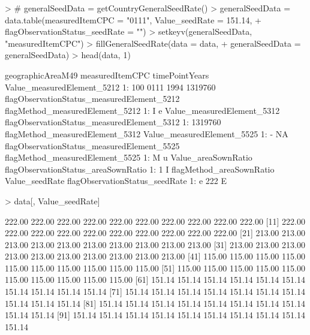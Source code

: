 \documentclass[nojss]{jss}
\begin{document}
\begin{Schunk}
\begin{Sinput}
> # generalSeedData = getCountryGeneralSeedRate()
> generalSeedData = data.table(measuredItemCPC = "0111", Value_seedRate = 151.14,
+                              flagObservationStatus_seedRate = "")
> setkeyv(generalSeedData, "measuredItemCPC")
> fillGeneralSeedRate(data = data,
+                     generalSeedData = generalSeedData)
> head(data, 1)
\end{Sinput}
\begin{Soutput}
   geographicAreaM49 measuredItemCPC timePointYears Value_measuredElement_5212
1:               100            0111           1994                    1319760
   flagObservationStatus_measuredElement_5212 flagMethod_measuredElement_5212
1:                                          I                               e
   Value_measuredElement_5312 flagObservationStatus_measuredElement_5312
1:                    1319760                                           
   flagMethod_measuredElement_5312 Value_measuredElement_5525
1:                               -                         NA
   flagObservationStatus_measuredElement_5525 flagMethod_measuredElement_5525
1:                                          M                               u
   Value_areaSownRatio flagObservationStatus_areaSownRatio
1:                   1                                   I
   flagMethod_areaSownRatio Value_seedRate flagObservationStatus_seedRate
1:                        e            222                              E
\end{Soutput}
\begin{Sinput}
> data[, Value_seedRate]
\end{Sinput}
\begin{Soutput}
  [1] 222.00 222.00 222.00 222.00 222.00 222.00 222.00 222.00 222.00 222.00
 [11] 222.00 222.00 222.00 222.00 222.00 222.00 222.00 222.00 222.00 222.00
 [21] 213.00 213.00 213.00 213.00 213.00 213.00 213.00 213.00 213.00 213.00
 [31] 213.00 213.00 213.00 213.00 213.00 213.00 213.00 213.00 213.00 213.00
 [41] 115.00 115.00 115.00 115.00 115.00 115.00 115.00 115.00 115.00 115.00
 [51] 115.00 115.00 115.00 115.00 115.00 115.00 115.00 115.00 115.00 115.00
 [61] 151.14 151.14 151.14 151.14 151.14 151.14 151.14 151.14 151.14 151.14
 [71] 151.14 151.14 151.14 151.14 151.14 151.14 151.14 151.14 151.14 151.14
 [81] 151.14 151.14 151.14 151.14 151.14 151.14 151.14 151.14 151.14 151.14
 [91] 151.14 151.14 151.14 151.14 151.14 151.14 151.14 151.14 151.14 151.14
\end{Soutput}
\end{Schunk}
\end{document}
